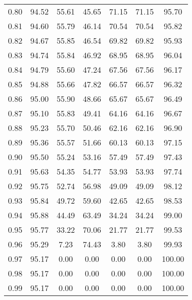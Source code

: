 \begin{tabular}{|c|c|c|c|c|c|c|}
      0.80 &     94.52 &     55.61 &      45.65 &   71.15 &      71.15 &         95.70 \\
      0.81 &     94.60 &     55.79 &      46.14 &   70.54 &      70.54 &         95.82 \\
      0.82 &     94.67 &     55.85 &      46.54 &   69.82 &      69.82 &         95.93 \\
      0.83 &     94.74 &     55.84 &      46.92 &   68.95 &      68.95 &         96.04 \\
      0.84 &     94.79 &     55.60 &      47.24 &   67.56 &      67.56 &         96.17 \\
      0.85 &     94.88 &     55.66 &      47.82 &   66.57 &      66.57 &         96.32 \\
      0.86 &     95.00 &     55.90 &      48.66 &   65.67 &      65.67 &         96.49 \\
      0.87 &     95.10 &     55.83 &      49.41 &   64.16 &      64.16 &         96.67 \\
      0.88 &     95.23 &     55.70 &      50.46 &   62.16 &      62.16 &         96.90 \\
      0.89 &     95.36 &     55.57 &      51.66 &   60.13 &      60.13 &         97.15 \\
      0.90 &     95.50 &     55.24 &      53.16 &   57.49 &      57.49 &         97.43 \\
      0.91 &     95.63 &     54.35 &      54.77 &   53.93 &      53.93 &         97.74 \\
      0.92 &     95.75 &     52.74 &      56.98 &   49.09 &      49.09 &         98.12 \\
      0.93 &     95.84 &     49.72 &      59.60 &   42.65 &      42.65 &         98.53 \\
      0.94 &     95.88 &     44.49 &      63.49 &   34.24 &      34.24 &         99.00 \\
      0.95 &     95.77 &     33.22 &      70.06 &   21.77 &      21.77 &         99.53 \\
      0.96 &     95.29 &      7.23 &      74.43 &    3.80 &       3.80 &         99.93 \\
      0.97 &     95.17 &      0.00 &       0.00 &    0.00 &       0.00 &        100.00 \\
      0.98 &     95.17 &      0.00 &       0.00 &    0.00 &       0.00 &        100.00 \\
      0.99 &     95.17 &      0.00 &       0.00 &    0.00 &       0.00 &        100.00 \\
\bottomrule
\end{tabular}
